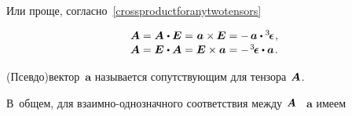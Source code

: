 Или проще, согласно~\eqref{crossproductforanytwotensors}

\nopagebreak\vspace{-0.1em}\begin{equation*}\begin{array}{c}
\bm{A} = \bm{A} \hspace{.1ex} \dotp \UnitDyad = \hspace{.1ex} \bm{a} \times \hspace{-0.1ex} \UnitDyad = - \hspace{.3ex} \bm{a} \dotp \permutationsparitytensor
\hspace{.1ex} ,
\\[.1em]
\bm{A} = \UnitDyad \hspace{.1ex} \dotp \bm{A} = \UnitDyad \times \bm{a} = - \hspace{.2ex} \permutationsparitytensor \dotp \bm{a}
\hspace{.2ex} .
\end{array}\end{equation*}

(Псевдо)вектор~$\bm{a}$ называется сопутствующим для тензора~${\hspace{-0.2ex}\bm{A}}$.

В~общем, для взаимно\hbox{-}однозначного соответствия между~${\hspace{-0.2ex}\bm{A}}$ ~$\bm{a}$ имеем

